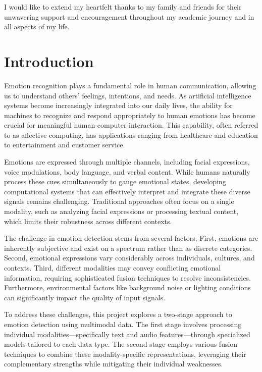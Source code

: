 \documentclass[12pt]{article}
\begin{document}
\noindent  
I would like to extend my heartfelt thanks to my family and friends for their unwavering support and encouragement throughout my academic journey and in all aspects of my life.

\bigskip

\newpage
\tableofcontents
\newpage
\bigskip
\listoffigures
\listoftables


\newpage
\vspace{-0.1in}
\section{Introduction}
\label{sec:intro}
Emotion recognition plays a fundamental role in human communication, allowing us to understand others' feelings, intentions, and needs. As artificial intelligence systems become increasingly integrated into our daily lives, the ability for machines to recognize and respond appropriately to human emotions has become crucial for meaningful human-computer interaction. This capability, often referred to as affective computing, has applications ranging from healthcare and education to entertainment and customer service.

Emotions are expressed through multiple channels, including facial expressions, voice modulations, body language, and verbal content. While humans naturally process these cues simultaneously to gauge emotional states, developing computational systems that can effectively interpret and integrate these diverse signals remains challenging. Traditional approaches often focus on a single modality, such as analyzing facial expressions or processing textual content, which limits their robustness across different contexts.

The challenge in emotion detection stems from several factors. First, emotions are inherently subjective and exist on a spectrum rather than as discrete categories. Second, emotional expressions vary considerably across individuals, cultures, and contexts. Third, different modalities may convey conflicting emotional information, requiring sophisticated fusion techniques to resolve inconsistencies. Furthermore, environmental factors like background noise or lighting conditions can significantly impact the quality of input signals.

To address these challenges, this project explores a two-stage approach to emotion detection using multimodal data. The first stage involves processing individual modalities—specifically text and audio features—through specialized models tailored to each data type. The second stage employs various fusion techniques to combine these modality-specific representations, leveraging their complementary strengths while mitigating their individual weaknesses.
\end{document}
